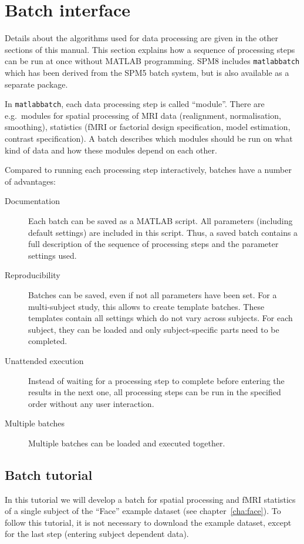 \documentclass[a4paper]{book}
\author{Volkmar Glauche}
\begin{document}
\chapter{Batch interface}
\label{cha:batch_interface}

Details about the algorithms used for data processing are given in the other
sections of this manual. This section explains how a sequence of processing
steps can be run at once without MATLAB programming. SPM8 includes
\texttt{matlabbatch}\cite{matlabbatch} which has been derived from the SPM5
batch system, but is also available as a separate package.

In \texttt{matlabbatch}, each data processing step is called ``module''. There
are e.g.\ modules for spatial processing of MRI data (realignment,
normalisation, smoothing), statistics (fMRI or factorial design specification,
model estimation, contrast specification). A batch describes which modules
should be run on what kind of data and how these modules depend on each other.

Compared to running each processing step interactively, batches have a number
of advantages:
\begin{description}
\item[Documentation] Each batch can be saved as a MATLAB script. All
  parameters (including default settings) are included in this script. Thus, a
  saved batch contains a full description of the sequence of processing steps
  and the parameter settings used.
\item[Reproducibility] Batches can be saved, even if not all parameters have
  been set. For a multi-subject study, this allows to create template batches.
  These templates contain all settings which do not vary across subjects. For
  each subject, they can be loaded and only subject-specific parts need to be
  completed.
\item[Unattended execution] Instead of waiting for a processing step to
  complete before entering the results in the next one, all processing steps
  can be run in the specified order without any user interaction.
\item[Multiple batches] Multiple batches can be loaded and executed together.
\end{description}

\section{Batch tutorial}

In this tutorial we will develop a batch for spatial processing and fMRI
statistics of a single subject of the ``Face'' example dataset (see
chapter~\ref{cha:face}). To follow this tutorial, it is not necessary to
download the example dataset, except for the last step (entering subject
dependent data).
\end{document}
